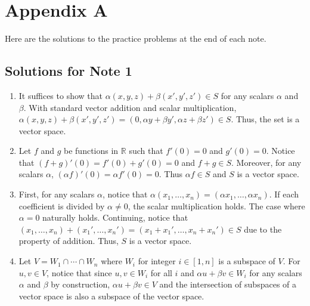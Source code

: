 \documentclass[../main.tex]{subfiles}
\begin{document}
\chapter{Appendix A}

Here are the solutions to the practice problems at the end of each
note.

\section{Solutions for Note 1}
\begin{enumerate}
\item
It suffices to show that $\alpha (x, y, z) + \beta (x', y', z') \in S$
for any scalars $\alpha$ and $\beta$. With standard vector addition
and scalar multiplication, $\alpha (x, y, z) + \beta (x', y', z') =
(0, \alpha y + \beta y', \alpha z + \beta z') \in S$. Thus, the set
is a vector space.

\item
Let $f$ and $g$ be functions in $\mathbb{R}$ such that $f'(0) = 0$
and $g'(0) = 0$. Notice that $(f + g)'(0) = f'(0) + g'(0) = 0$ and
$f + g \in S$. Moreover, for any scalars $\alpha$, $(\alpha f)'(0)
= \alpha f'(0) = 0$. Thus $\alpha f \in S$ and $S$ is a vector
space.

\item
First, for any scalars $\alpha$, notice that $\alpha(x_1, \ldots, x_n)
= (\alpha x_1, \ldots, \alpha x_n)$. If each coefficient is divided
by $\alpha \neq 0$, the scalar multiplication holds. The case where
$\alpha = 0$ naturally holds. Continuing, notice that $(x_1, \ldots,
x_n) + (x_1', \ldots, x_n') = (x_1 + x_1', \ldots, x_n + x_n') \in S$
due to the property of addition. Thus, $S$ is a vector space.

\item
Let $V = W_1 \cap \cdots \cap W_n$ where $W_i$ for integer $i \in
[1, n]$ is a subspace of $V$. For $u, v \in V$, notice that since
$u, v \in W_i$ for all $i$ and $\alpha u + \beta v \in W_i$ for any
scalars $\alpha$ and $\beta$ by construction, $\alpha u + \beta v \in
V$ and the intersection of subspaces of a vector space is also a
subspace of the vector space.


\end{enumerate}
\end{document}
